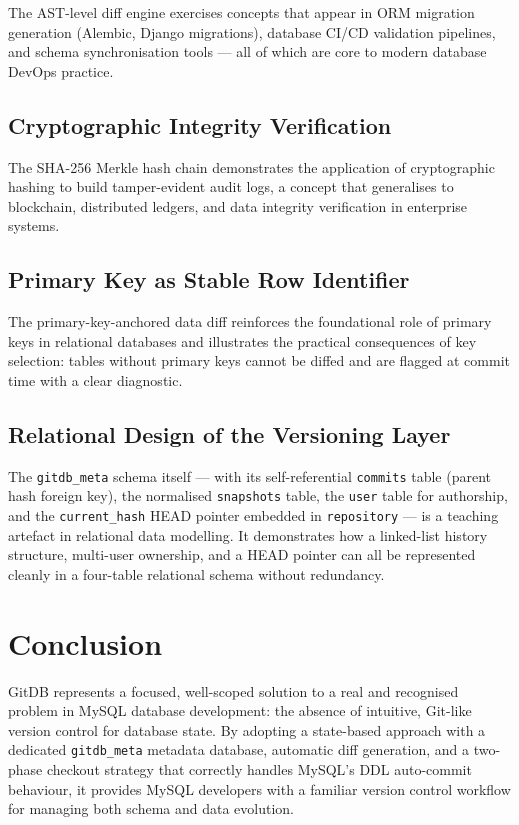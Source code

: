 \documentclass[12pt, a4paper]{article}
\begin{document}
The AST-level diff engine exercises concepts that appear in ORM migration
generation (Alembic, Django migrations), database CI/CD validation pipelines,
and schema synchronisation tools --- all of which are core to modern database
DevOps practice.

\subsection{Cryptographic Integrity Verification}

The SHA-256 Merkle hash chain demonstrates the application of cryptographic
hashing to build tamper-evident audit logs, a concept that generalises to
blockchain, distributed ledgers, and data integrity verification in enterprise
systems.

\subsection{Primary Key as Stable Row Identifier}

The primary-key-anchored data diff reinforces the foundational role of primary
keys in relational databases and illustrates the practical consequences of key
selection: tables without primary keys cannot be diffed and are flagged at
commit time with a clear diagnostic.

\subsection{Relational Design of the Versioning Layer}

The \texttt{gitdb\_meta} schema itself --- with its self-referential
\texttt{commits} table (parent hash foreign key), the normalised
\texttt{snapshots} table, the \texttt{user} table for authorship, and the
\texttt{current\_hash} HEAD pointer embedded in \texttt{repository} --- is a
teaching artefact in relational data modelling. It demonstrates how a linked-list
history structure, multi-user ownership, and a HEAD pointer can all be represented
cleanly in a four-table relational schema without redundancy.

\section{Conclusion}

GitDB represents a focused, well-scoped solution to a real and recognised problem
in MySQL database development: the absence of intuitive, Git-like version control
for database state. By adopting a state-based approach with a dedicated
\texttt{gitdb\_meta} metadata database, automatic diff generation, and a
two-phase checkout strategy that correctly handles MySQL's DDL auto-commit
behaviour, it provides MySQL developers with a familiar version control workflow
for managing both schema and data evolution.
\end{document}
